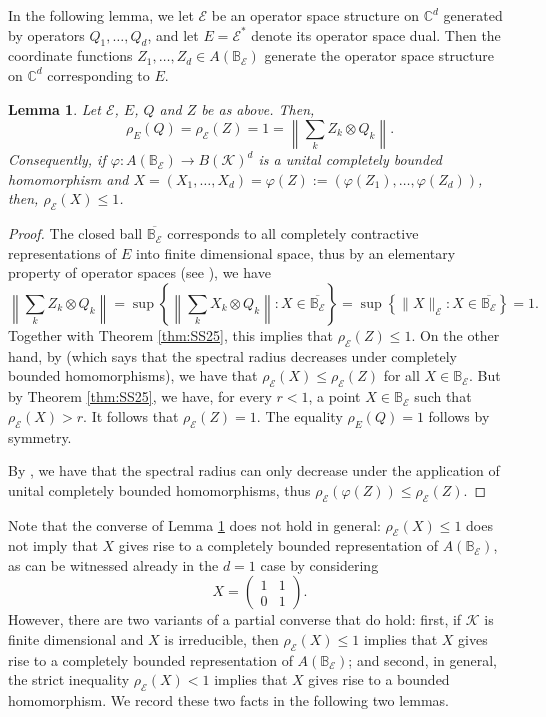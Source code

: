 \documentclass[12pt]{amsart}
\numberwithin{equation}{section}
\newtheorem{lemma}[theorem]{Lemma}
\theoremstyle{definition}
\newcommand{\be}{\begin{equation}}
\newcommand{\ee}{\end{equation}}
\newcommand{\cE}{\mathcal{E}}
\newcommand{\cK}{\mathcal{K}}
\newcommand{\bB}{\mathbb{B}}
\newcommand{\bC}{\mathbb{C}}
\newcommand{\ol}{\overline}
\begin{document}
In the following lemma, we let $\cE$ be an operator space structure on $\bC^d$ generated by operators $Q_1, \ldots, Q_d$, and let $E = \cE^*$ denote its operator space dual. 
Then the coordinate functions $Z_1, \ldots, Z_d \in A(\bB_\cE)$ generate the operator space structure on $\bC^d$ corresponding to $E$. 
\begin{lemma}\label{lem:specrad_homo}
Let $\cE$, $E$, $Q$ and $Z$ be as above. Then, 
\be\label{eq:claim}
\rho_{E}(Q) = \rho_{\cE}(Z) = 1 = \left\|\sum_k Z_k \otimes Q_k \right\| .
\ee
Consequently, if $\varphi \colon A(\bB_\cE) \to B(\cK)^d$ is a unital completely bounded homomorphism and $X = (X_1, \ldots, X_d) = \varphi(Z) := (\varphi(Z_1), \ldots, \varphi(Z_d))$, 
    then, $\rho_\cE(X) \leq 1$.
\end{lemma}
\begin{proof}
    The closed ball $\ol{\bB_{\cE}}$ corresponds to all completely contractive representations of $E$ into finite dimensional space, thus by an elementary property of operator spaces (see \cite[Remark 2.1.2]{Pisier-book}), we have
    \[
    \left\|\sum_k Z_k \otimes Q_k \right\| = \sup\left\{ \left\| \sum_k X_k \otimes Q_k \right\| : X \in \ol{\bB_{\cE}} \right\} = \sup\left\{ \|X\|_{\cE} : X \in \ol{\bB_{\cE}} \right\} = 1. 
    \]
    Together with Theorem \ref{thm:SS25}, this implies that $\rho_{\cE}(Z) \leq 1$. 
    On the other hand, by \cite[Remark 2.4]{shalsham2025spectral} (which says that the spectral radius decreases under completely bounded homomorphisms), we have that $\rho_{\cE}(X) \leq \rho_{\cE}(Z)$ for all $X \in \bB_\cE$. 
    But by Theorem \ref{thm:SS25}, we have, for every $r<1$, a point $X \in \bB_\cE$ such that $\rho_\cE(X) > r$. It follows that $\rho_\cE(Z) = 1$. 
    The equality $\rho_E(Q) = 1$ follows by symmetry. 

By \cite[Remark 2.4]{shalsham2025spectral}, we have that the spectral radius can only decrease under the application of unital completely bounded homomorphisms, thus $\rho_\cE(\varphi(Z))\leq\rho_\cE(Z)$. 
\end{proof}

    Note that the converse of Lemma \ref{lem:specrad_homo} does not hold in general: $\rho_\cE(X) \leq 1$ does not imply that $X$ gives rise to a completely bounded representation of $A(\bB_\cE)$, as can be witnessed already in the $d = 1$ case by considering 
    \[
      X = 
      \begin{pmatrix}
      1 & 1 \\
      0 & 1
      \end{pmatrix} .
    \]
However, there are two variants of a partial converse that do hold: first, if $\cK$ is finite dimensional and $X$ is irreducible, then $\rho_\cE(X) \leq 1$ implies that $X$ gives rise to a completely bounded representation of $A(\bB_\cE)$; and second, in general, the strict inequality $\rho_\cE(X) < 1$ implies that $X$ gives rise to a bounded homomorphism. 
We record these two facts in the following two lemmas. 
\end{document}
